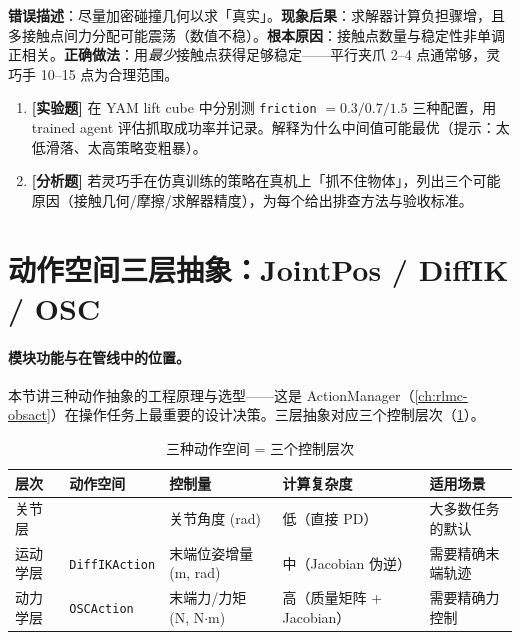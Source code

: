 \begin{pitfall}[认为「更多接触点 = 更好的仿真」]
\textbf{错误描述}：尽量加密碰撞几何以求「真实」。\textbf{现象后果}：求解器计算负担骤增，且多接触点间力分配可能震荡（数值不稳）。\textbf{根本原因}：接触点数量与稳定性非单调正相关。\textbf{正确做法}：用\emph{最少}接触点获得足够稳定——平行夹爪 2--4 点通常够，灵巧手 10--15 点为合理范围。
\end{pitfall}

\begin{practice}[本节练习]
\begin{enumerate}
  \item \textbf{[实验题]} 在 YAM lift cube 中分别测 \verb|friction| $=0.3/0.7/1.5$ 三种配置，用 trained agent 评估抓取成功率并记录。解释为什么中间值可能最优（提示：太低滑落、太高策略变粗暴）。
  \item \textbf{[分析题]} 若灵巧手在仿真训练的策略在真机上「抓不住物体」，列出三个可能原因（接触几何/摩擦/求解器精度），为每个给出排查方法与验收标准。
\end{enumerate}
\end{practice}

\section{动作空间三层抽象：JointPos / DiffIK / OSC}
\label{sec:rlmc-manip-action}

\paragraph{模块功能与在管线中的位置。}本节讲三种动作抽象的工程原理与选型——这是 ActionManager（\cref{ch:rlmc-obsact}）在操作任务上最重要的设计决策。三层抽象对应三个控制层次（\cref{tab:rlmc-manip-actionlevels}）。

\begin{table}[ht]
\centering
\small
\caption{三种动作空间 = 三个控制层次}
\label{tab:rlmc-manip-actionlevels}
\begin{tabular}{@{}lllll@{}}
\toprule
层次 & 动作空间 & 控制量 & 计算复杂度 & 适用场景 \\
\midrule
关节层 & \Verb[breaklines]|JointPositionAction| & 关节角度 (rad) & 低（直接 PD） & 大多数任务的默认 \\
运动学层 & \verb|DiffIKAction| & 末端位姿增量 (m, rad) & 中（Jacobian 伪逆） & 需要精确末端轨迹 \\
动力学层 & \verb|OSCAction| & 末端力/力矩 (N, N$\cdot$m) & 高（质量矩阵 + Jacobian） & 需要精确力控制 \\
\bottomrule
\end{tabular}
\end{table}

